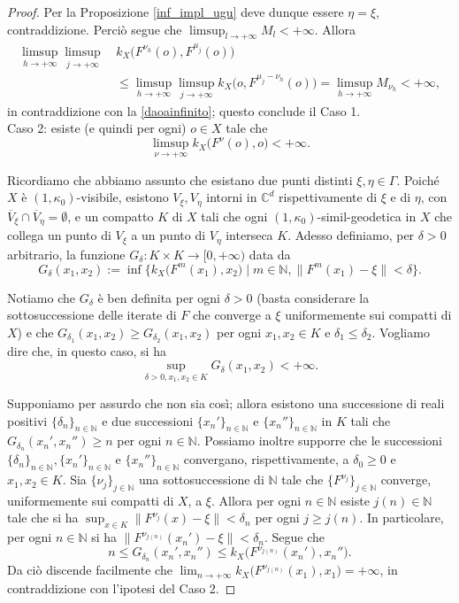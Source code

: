 \begin{proof}
    Per la Proposizione \ref{inf_impl_ugu} deve dunque essere $\eta=\xi$, contraddizione. Perciò segue che $\displaystyle\limsup_{l\longrightarrow+\infty}M_l<+\infty$. Allora
    \begin{align*}
        \limsup_{h\longrightarrow+\infty}\limsup_{j\longrightarrow+\infty}\, &k_X\big(F^{\nu_h}(o),F^{\mu_j}(o)\big) \\
        &\le \limsup_{h\longrightarrow+\infty}\limsup_{j\longrightarrow+\infty} k_X\big(o,F^{\mu_j-\nu_h}(o)\big)=\limsup_{h\longrightarrow+\infty}M_{\nu_h}<+\infty,
    \end{align*}
    in contraddizione con la \eqref{daoainfinito}; questo conclude il Caso 1.\\

    Caso 2: esiste (e quindi per ogni) $o \in X$ tale che
    $$\limsup_{\nu\longrightarrow+\infty} k_X\big(F^\nu(o),o\big)<+\infty.$$
    
    Ricordiamo che abbiamo assunto che esistano due punti distinti $\xi,\eta\in\Gamma$. Poiché $X$ è $(1,\kappa_0)$-visibile, esistono $V_\xi, V_\eta$ intorni in $\mathbb{C}^d$ rispettivamente di $\xi$ e di $\eta$, con $\overline{V}_\xi\cap\overline{V}_\eta=\emptyset$, e un compatto $K$ di $X$ tali che ogni $(1,\kappa_0)$-simil-geodetica in $X$ che collega un punto di $V_\xi$ a un punto di $V_\eta$ interseca $K$.
    Adesso definiamo, per $\delta>0$ arbitrario, la funzione $G_\delta:K\times K\longrightarrow [0,+\infty)$ data da
    $$G_\delta(x_1,x_2):=\inf\{k_X\big(F^m(x_1),x_2\big)\mid m\in\mathbb{N}, \|F^m(x_1)-\xi\|<\delta\}.$$

    Notiamo che $G_\delta$ è ben definita per ogni $\delta>0$ (basta considerare la sottosuccessione delle iterate di $F$ che converge a $\xi$ uniformemente sui compatti di $X$) e che $G_{\delta_1}(x_1,x_2) \ge G_{\delta_2}(x_1,x_2)$ per ogni $x_1,x_2 \in K$ e $\delta_1 \le \delta_2$. Vogliamo dire che, in questo caso, si ha
    $$\sup_{\delta>0,x_1,x_2\in K}G_\delta(x_1,x_2)<+\infty.$$

    Supponiamo per assurdo che non sia così; allora esistono una successione di reali positivi $\{\delta_n\}_{n\in\mathbb{N}}$ e due successioni $\{x_n'\}_{n\in\mathbb{N}}$ e $\{x_n''\}_{n\in\mathbb{N}}$ in $K$ tali che $G_{\delta_n}(x_n',x_n'') \ge n$ per ogni $n\in\mathbb{N}$. Possiamo inoltre supporre che le successioni $\{\delta_n\}_{n\in\mathbb{N}}, \{x_n'\}_{n\in\mathbb{N}}$ e $\{x_n''\}_{n\in\mathbb{N}}$ convergano, rispettivamente, a $\delta_0 \ge 0$ e $x_1,x_2\in K$. Sia $\{\nu_j\}_{j\in\mathbb{N}}$ una sottosuccessione di $\mathbb{N}$ tale che $\{F^{\nu_j}\}_{j\in\mathbb{N}}$ converge, uniformemente sui compatti di $X$, a $\xi$. Allora per ogni $n\in\mathbb{N}$ esiste $j(n)\in\mathbb{N}$ tale che si ha $\displaystyle\sup_{x\in K}\|F^{\nu_j}(x)-\xi\|<\delta_n$ per ogni $j \ge j(n)$. In particolare, per ogni $n \in \mathbb{N}$ si ha $\|F^{\nu_{j(n)}}(x_n')-\xi\|<\delta_n$. Segue che
    $$n \le G_{\delta_n}(x_n',x_n'') \le k_X\big(F^{\nu_{j(n)}}(x_n'),x_n''\big).$$
    Da ciò discende facilmente che $\displaystyle\lim_{n\longrightarrow+\infty}k_X\big(F^{\nu_{j(n)}}(x_1),x_1\big)=+\infty$, in contraddizione con l'ipotesi del Caso 2.


\end{proof}
